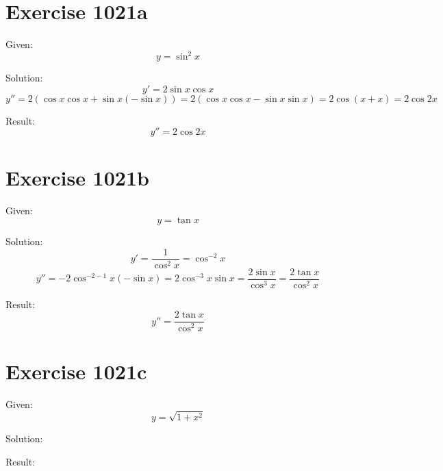 \documentclass[a4paper, 10pt]{scrartcl}
\begin{document}
\section{Exercise 1021a}

Given:
\[
y = \sin^{2}{x}
\]

Solution:
\[
y' = 2\sin{x}\cos{x}
\]
\[
y'' = 2(\cos{x}\cos{x} + \sin{x}(-\sin{x})) = 2(\cos{x}\cos{x} - \sin{x}\sin{x}) = 2\cos{(x + x)} = 2\cos{2x}
\]

Result:
\[
y'' = 2\cos{2x}
\]

\section{Exercise 1021b}

Given:
\[
y = \tan{x}
\]

Solution:
\[
y' = \frac{1}{\cos^{2}{x}} = \cos^{-2}{x}
\]
\[
y'' = -2\cos^{-2 - 1}{x}(-\sin{x}) = 2\cos^{-3}{x}\sin{x} = \frac{2\sin{x}}{\cos^{3}{x}} = \frac{2\tan{x}}{\cos^{2}{x}}
\]

Result:
\[
y'' = \frac{2\tan{x}}{\cos^{2}{x}}
\]

\section{Exercise 1021c}

Given:
\[
y = \sqrt{1 + x^{2}}
\]

Solution:

Result:
\end{document}
